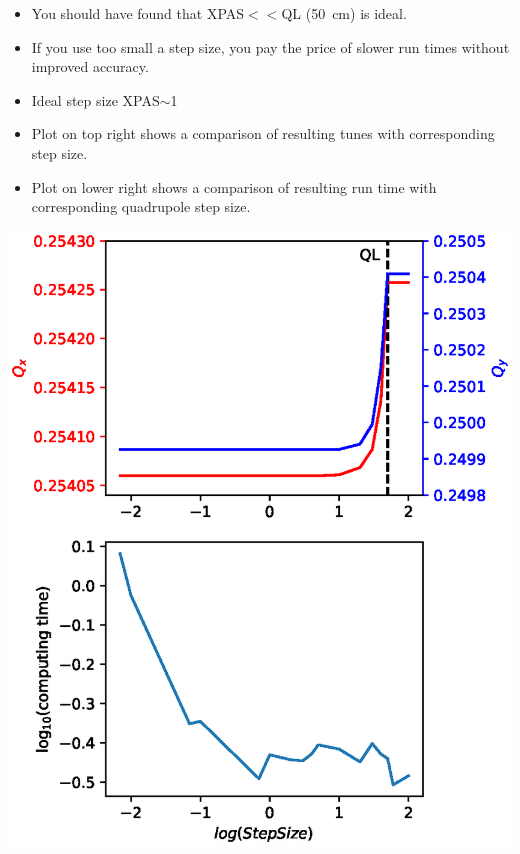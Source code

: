 \documentclass{beamer}
\begin{document}
\begin{frame}
\hspace*{-2em}
\begin{minipage}{0.5\textwidth}
\begin{itemize}
\small
\item You should have found that XPAS$<<$QL (50~cm) is ideal.
\item If you use too small a step size, you pay the price of slower run times without improved accuracy.
\item Ideal step size XPAS$\sim$1
\item Plot on top right shows a comparison of resulting tunes with corresponding step size.
\item Plot on lower right shows a comparison of resulting run time with corresponding quadrupole step size.
\end{itemize}
\end{minipage}
\begin{minipage}{0.5\textwidth}
\includegraphics[width=1.0\linewidth]{Int_step.eps}
\end{minipage}
\end{frame}
\end{document}
